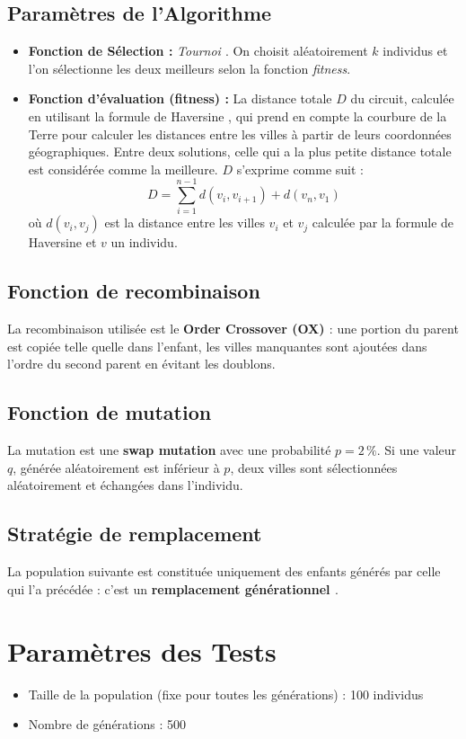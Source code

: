 \documentclass[a4paper,12pt]{article}
\begin{document}
\subsection{Paramètres de l'Algorithme}
\begin{itemize}
    \item \textbf{Fonction de Sélection :} \emph{Tournoi \cite{selection_tournoi}}. On choisit aléatoirement $k$ individus et l'on sélectionne les deux meilleurs selon la fonction \textit{fitness}.
    \item \textbf{Fonction d'évaluation (fitness) :} La distance totale $D$ du circuit, calculée en utilisant la formule de Haversine \cite{haversine}, qui prend en compte la courbure de la Terre pour calculer les distances entre les villes à partir de leurs coordonnées géographiques. Entre deux solutions, celle qui a la plus petite distance totale est considérée comme la meilleure.
    $D$ s'exprime comme suit :
    \[D = \sum_{i=1}^{n-1} d(v_i, v_{i+1}) + d(v_n, v_1)\]
    où $d(v_i, v_j)$ est la distance entre les villes $v_i$ et $v_j$ calculée par la formule de Haversine \cite{haversine} et $v$ un individu.
\end{itemize}

\subsection{Fonction de recombinaison}
La recombinaison utilisée est le \textbf{Order Crossover (OX) \cite{ox_crossover} }: une portion du parent est copiée telle quelle dans l’enfant, les villes manquantes sont ajoutées dans l’ordre du second parent en évitant les doublons.

\subsection{Fonction de mutation}
La mutation est une \textbf{swap mutation} avec une probabilité $p = 2\,\%$. Si une valeur $q$, générée aléatoirement est inférieur à $p$, deux villes sont sélectionnées aléatoirement et échangées dans l’individu.

\subsection{Stratégie de remplacement}
La population suivante est constituée uniquement des enfants générés par celle qui l'a précédée : c'est un \textbf{remplacement générationnel \cite{remplacement_gen}}.

\section{Paramètres des Tests}
\begin{itemize}
    \item Taille de la population (fixe pour toutes les générations) : 100 individus
    \item Nombre de générations : 500
\end{itemize}
\end{document}
